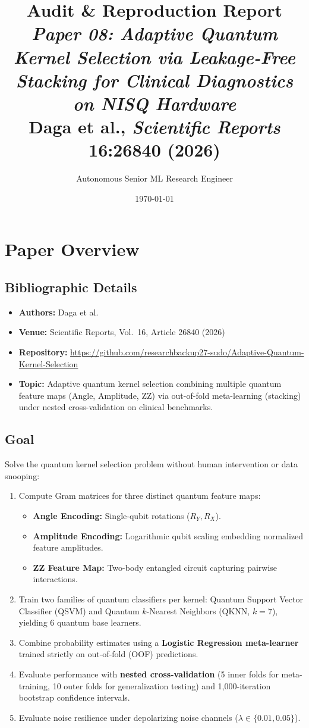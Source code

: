 \documentclass[12pt,a4paper]{article}
\title{\textbf{Audit \& Reproduction Report}\\[0.4em]
\large\textit{Paper 08: Adaptive Quantum Kernel Selection via Leakage-Free Stacking for Clinical Diagnostics on NISQ Hardware}\\[0.3em]
Daga et al., \textit{Scientific Reports} 16:26840 (2026)}
\author{Autonomous Senior ML Research Engineer}
\date{\today}
\begin{document}
\maketitle
\tableofcontents
\newpage

\section{Paper Overview}
\subsection{Bibliographic Details}
\begin{itemize}[leftmargin=*]
  \item \textbf{Authors:} Daga et al.
  \item \textbf{Venue:} Scientific Reports, Vol.~16, Article 26840 (2026)
  \item \textbf{Repository:} \url{https://github.com/researchbackup27-sudo/Adaptive-Quantum-Kernel-Selection}
  \item \textbf{Topic:} Adaptive quantum kernel selection combining multiple quantum feature maps (Angle, Amplitude, ZZ) via out-of-fold meta-learning (stacking) under nested cross-validation on clinical benchmarks.
\end{itemize}

\subsection{Goal}
Solve the quantum kernel selection problem without human intervention or data snooping:
\begin{enumerate}[leftmargin=*]
  \item Compute Gram matrices for three distinct quantum feature maps:
    \begin{itemize}
      \item \textbf{Angle Encoding:} Single-qubit rotations ($R_Y, R_X$).
      \item \textbf{Amplitude Encoding:} Logarithmic qubit scaling embedding normalized feature amplitudes.
      \item \textbf{ZZ Feature Map:} Two-body entangled circuit capturing pairwise interactions.
    \end{itemize}
  \item Train two families of quantum classifiers per kernel: Quantum Support Vector Classifier (QSVM) and Quantum $k$-Nearest Neighbors (QKNN, $k=7$), yielding 6 quantum base learners.
  \item Combine probability estimates using a \textbf{Logistic Regression meta-learner} trained strictly on out-of-fold (OOF) predictions.
  \item Evaluate performance with \textbf{nested cross-validation} (5 inner folds for meta-training, 10 outer folds for generalization testing) and 1,000-iteration bootstrap confidence intervals.
  \item Evaluate noise resilience under depolarizing noise channels ($\lambda \in \{0.01, 0.05\}$).
\end{enumerate}
\end{document}
